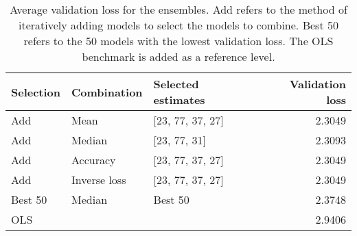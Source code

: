 \begin{table}
\centering
\caption{Average validation loss for the ensembles. Add refers to the method of iteratively adding models to select the models to combine. Best 50 refers to the 50 models with the lowest validation loss. The OLS benchmark is added as a reference level.}
\label{tab:Results_combined}
\begin{tabular}{lllr}
\toprule
Selection &  Combination & Selected estimates &  Validation loss \\
\midrule
      Add &         Mean &   [23, 77, 37, 27] &           2.3049 \\
      Add &       Median &       [23, 77, 31] &           2.3093 \\
      Add &     Accuracy &   [23, 77, 37, 27] &           2.3049 \\
      Add & Inverse loss &   [23, 77, 37, 27] &           2.3049 \\
  Best 50 &       Median &            Best 50 &           2.3748 \\
      OLS &              &                    &           2.9406 \\
\bottomrule
\end{tabular}
\end{table}
